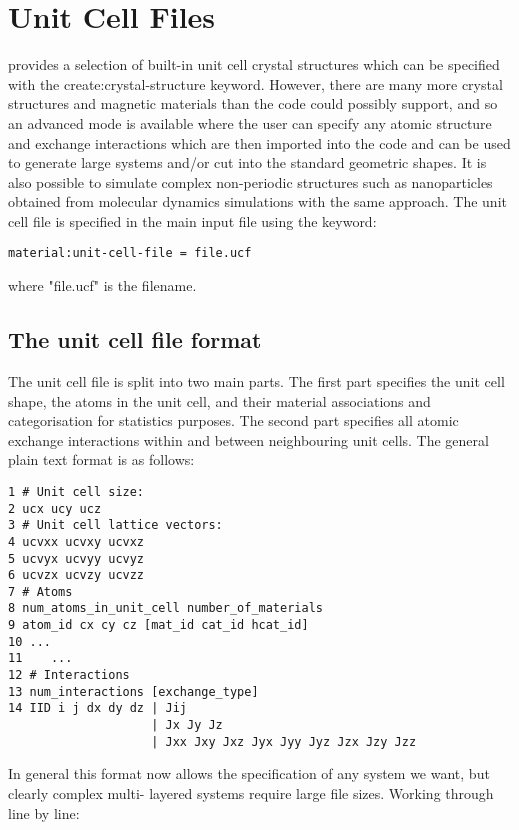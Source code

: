 \chapter{Unit Cell Files}\label{chap:unitcellfiles}
\vampire provides a selection of built-in unit cell crystal structures which can be specified with the 
create:crystal-structure keyword. However, there are many more crystal structures and magnetic materials than the code could possibly support, and so an advanced mode is available where the user can specify any atomic structure and exchange interactions which are then imported into the code and can be used to generate large systems and/or cut into the standard geometric shapes. It is also possible to simulate complex non-periodic structures such as nanoparticles obtained from molecular dynamics simulations with the same approach. The unit cell file is specified in the main input file using the keyword:
\begin{verbatim}
material:unit-cell-file = file.ucf
\end{verbatim}
where "file.ucf" is the filename. 

\section*{The unit cell file format}
The unit cell file is split into two main parts. The first part specifies the unit cell shape, the atoms in the unit cell, and their material associations and categorisation for statistics purposes. The second part specifies all atomic exchange interactions within and between neighbouring unit cells. The general plain text format is as follows:

\begin{verbatim}
1 # Unit cell size:
2 ucx ucy ucz
3 # Unit cell lattice vectors:
4 ucvxx ucvxy ucvxz
5 ucvyx ucvyy ucvyz
6 ucvzx ucvzy ucvzz
7 # Atoms
8 num_atoms_in_unit_cell number_of_materials
9 atom_id cx cy cz [mat_id cat_id hcat_id]
10 ...
11    ...
12 # Interactions
13 num_interactions [exchange_type] 
14 IID i j dx dy dz | Jij
                    | Jx Jy Jz
                    | Jxx Jxy Jxz Jyx Jyy Jyz Jzx Jzy Jzz
\end{verbatim}

In general this format now allows the specification of any system we want, but clearly complex multi- layered systems require large file sizes. Working through line by line:\\

